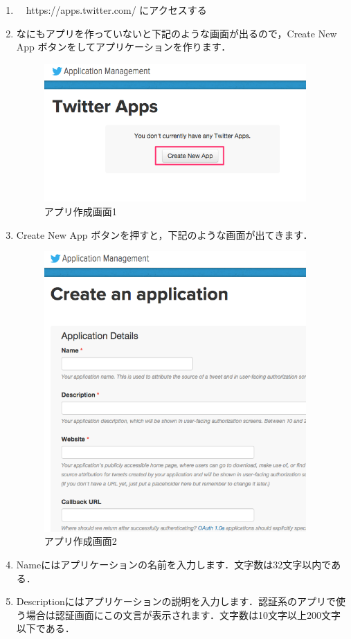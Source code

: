 \begin{enumerate}
\item　https://apps.twitter.com/ にアクセスする
\item なにもアプリを作っていないと下記のような画面が出るので，Create New App ボタンをしてアプリケーションを作ります．
\begin{figure}[htb]
\centering
\includegraphics[width=10cm]{10.png}
\caption{アプリ作成画面1}\label{10}
\end{figure}
\item Create New App ボタンを押すと，下記のような画面が出てきます．
\begin{figure}[htb]
\centering
\includegraphics[width=10cm]{11.png}
\caption{アプリ作成画面2}\label{11}
\end{figure}
\item Nameにはアプリケーションの名前を入力します．文字数は32文字以内である．
\item Descriptionにはアプリケーションの説明を入力します．認証系のアプリで使う場合は認証画面にこの文言が表示されます．文字数は10文字以上200文字以下である．

\end{enumerate}
